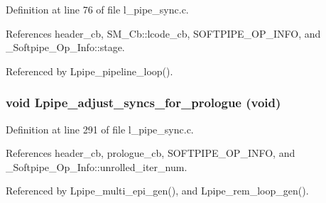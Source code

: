 Definition at line 76 of file l\_\-pipe\_\-sync.c.

References header\_\-cb, SM\_\-Cb::lcode\_\-cb, SOFTPIPE\_\-OP\_\-INFO, and \_\-Softpipe\_\-Op\_\-Info::stage.

Referenced by Lpipe\_\-pipeline\_\-loop().
\subsubsection{\setlength{\rightskip}{0pt plus 5cm}void Lpipe\_\-adjust\_\-syncs\_\-for\_\-prologue (void)}\label{l__pipe__sync_8h_d9b8990e5b0abcad84d75eea67f9326e}




Definition at line 291 of file l\_\-pipe\_\-sync.c.

References header\_\-cb, prologue\_\-cb, SOFTPIPE\_\-OP\_\-INFO, and \_\-Softpipe\_\-Op\_\-Info::unrolled\_\-iter\_\-num.

Referenced by Lpipe\_\-multi\_\-epi\_\-gen(), and Lpipe\_\-rem\_\-loop\_\-gen().